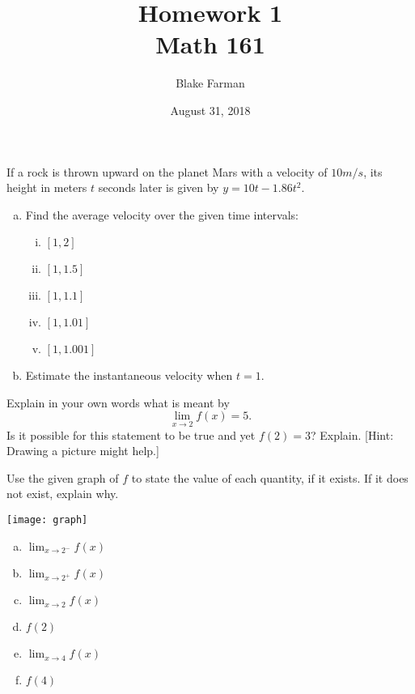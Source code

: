 \documentclass[10pt]{amsart}
\title[Homework 2]{Homework 1\\Math 161}
\date{August 31, 2018}
\author{Blake Farman}
\begin{document}
\maketitle

\makenameslot

\begin{thm}
  If a rock is thrown upward on the planet Mars with a velocity of \(10 m/s\), its height in meters \(t\) seconds later is given by \(y = 10t - 1.86t^2\).
  \begin{enumerate}[(a)]
  \item
    Find the average velocity over the given time intervals:
    \begin{enumerate}[(i)]
    \item
      \([1,2]\)
      \vspace{1in}
    \item
      \([1,1.5]\)
      \vspace{1in}
    \item
      \([1,1.1]\)
      \vspace{1in}
    \item
      \([1,1.01]\)
      \newpage
    \item
      \([1,1.001]\)
      \vspace{1in}
    \end{enumerate}
  \item
    Estimate the instantaneous velocity when \(t = 1\).
    \vspace{1in}
  \end{enumerate}
\end{thm}

\begin{thm}
  Explain in your own words what is meant by
  \[\lim_{x \to 2} f(x) = 5.\]
  Is it possible for this statement to be true and yet \(f(2) = 3\)?
  Explain.
  {[Hint: Drawing a picture might help.]}
\end{thm}

\vspace{2in}

\begin{thm}
  Use the given graph of \(f\) to state the value of each quantity, if it exists.
  If it does not exist, explain why.
  \begin{center}
    \texttt{[image: graph]}
  \end{center}
  \newpage
  \begin{enumerate}[(a)]
  \item
    \(\lim_{x \to 2^{-}} f(x)\)
    \vspace{1in}
  \item
    \(\lim_{x \to 2^{+}} f(x)\)
    \vspace{1in}
  \item
    \(\lim_{x \to 2} f(x)\)
    \vspace{1in}
  \item
    \(f(2)\)
    \vspace{1in}
  \item
    \(\lim_{x \to 4} f(x)\)
    \vspace{1in}
  \item
    \(f(4)\)
    \vspace{1in}
  \end{enumerate}
\end{thm}
\end{document}
